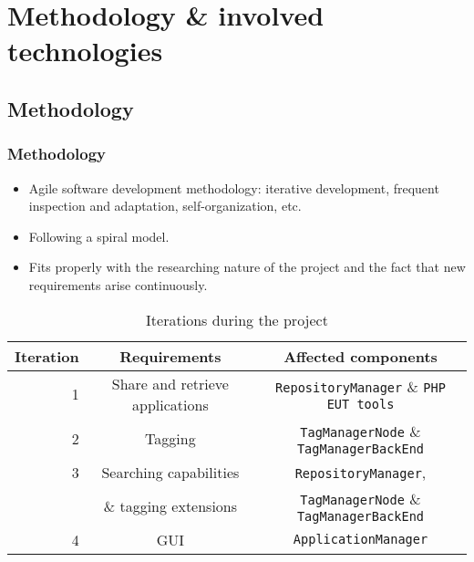 \section{Methodology \& involved technologies}

\subsection{Methodology}

\begin{frame}

	\frametitle{Methodology} 
	
	\begin{itemize}
	  \item Agile software development methodology: iterative development, frequent
	  inspection and adaptation, self-organization, etc.
	  \item Following a spiral model.
	  \item Fits properly with the researching nature of the project and the
		fact that new requirements arise continuously.
	\end{itemize}
	
	
	
		\begin{table}[h]
			\tiny
			\centering
			\begin{tabular}{||r|c|c||}
			\hline \hline
			Iteration & Requirements & Affected components
			\\
			\hline
			\hline 
			1 & Share and retrieve applications & \texttt{RepositoryManager} \& \texttt{PHP
			EUT tools}\\
			\hline
			2 & Tagging & \texttt{TagManagerNode} \& \texttt{TagManagerBackEnd} \\
			\hline
			3 & Searching capabilities & \texttt{RepositoryManager},\\
			  &	\& tagging extensions &\texttt{TagManagerNode} \& \texttt{TagManagerBackEnd}\\
			\hline
			4 & GUI & \texttt{ApplicationManager} \\
			\hline \hline
			\end{tabular}
			\caption{\label{table:iterations}Iterations during the project}
		\end{table}

\end{frame}

